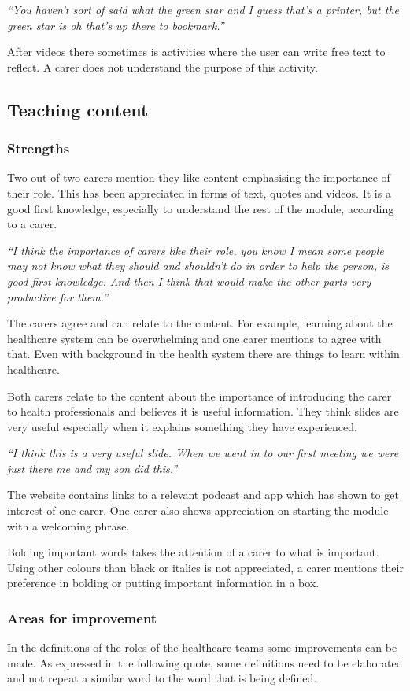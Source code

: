 \documentclass{sigchi}
\begin{document}
\textit{“You haven’t sort of said what the green star and I guess that’s a printer, but the green star is oh that’s up there to bookmark.”}

After videos there sometimes is activities where the user can write free text to reflect. A carer does not understand the purpose of this activity. 

\subsection{Teaching content}
\subsubsection{Strengths}
Two out of two carers mention they like content emphasising the importance of their role. This has been appreciated in forms of text, quotes and videos. It is a good first knowledge, especially to understand the rest of the module, according to a carer.

\textit{“I think the importance of carers like their role, you know I mean some people may not know what they should and shouldn't do in order to help the person, is good first knowledge. And then I think that would make the other parts very productive for them.”}

The carers agree and can relate to the content. For example, learning about the healthcare system can be overwhelming and one carer mentions to agree with that. Even with background in the health system there are things to learn within healthcare.

Both carers relate to the content about the importance of introducing the carer to health professionals and believes it is useful information. They think slides are very useful especially when it explains something they have experienced.

\textit{“I think this is a very useful slide. When we went in to our first meeting we were just there me and my son did this.”}

The website contains links to a relevant podcast and app which has shown to get interest of one carer. One carer also shows appreciation on starting the module with a welcoming phrase.

Bolding important words takes the attention of a carer to what is important. Using other colours than black or italics is not appreciated, a carer mentions their preference in bolding or putting important information in a box.

\subsubsection{Areas for improvement}
In the definitions of the roles of the healthcare teams some improvements can be made. As expressed in the following quote, some definitions need to be elaborated and not repeat a similar word to the word that is being defined.
\end{document}
